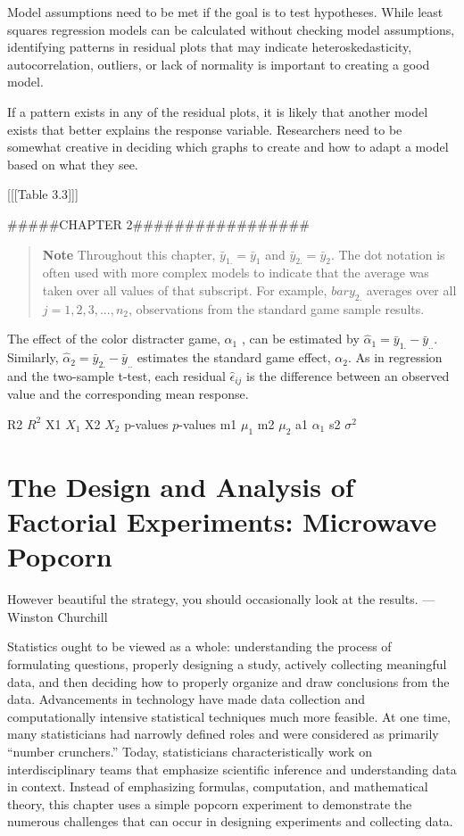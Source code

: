 \documentclass[
]{report}
\begin{document}
Model assumptions need to be met if the goal is to test hypotheses. While least squares regression models can be calculated without checking model assumptions, identifying patterns in residual plots that may indicate heteroskedasticity, autocorrelation, outliers, or lack of normality is important to creating a good model.

If a pattern exists in any of the residual plots, it is likely that another model exists that better explains the response variable. Researchers need to be somewhat creative in deciding which graphs to create and how to adapt a model based on what they see.

{[}{[}{[}Table 3.3{]}{]}{]}

\#\#\#\#\#CHAPTER 2\#\#\#\#\#\#\#\#\#\#\#\#\#\#\#\#\#

\begin{quote}
\textbf{Note}
Throughout this chapter, \(\bar{y}_{1.} = \bar{y}_{1}\) and \(\bar{y}_{2.} = \bar{y}_{2}\). The dot notation is often used with more complex models
to indicate that the average was taken over all values of that subscript. For example, \(bar{y}_{2.}\) averages over all
\(j = 1, 2, 3, ... , n_2\), observations from the standard game sample results.
\end{quote}

The effect of the color distracter game, \(\alpha_1\) , can be estimated by \(\hat{\alpha}_1 = \bar{y}_{1.} - \bar{y}_{..}\). Similarly, \(\hat{\alpha}_2 = \bar{y}_{2.} - \bar{y}_{..}\)
estimates the standard game effect, \(\alpha_2\). As in regression and the two-sample t-test, each residual \(\hat{\epsilon}_{ij}\) is the
difference between an observed value and the corresponding mean response.

R2 \(R^2\)
X1 \(X_1\)
X2 \(X_2\)
p-values \(p\)-values
m1 \(\mu_1\)
m2 \(\mu_2\)
a1 \(\alpha_1\)
s2 \(\sigma^2\)

\chapter{The Design and Analysis of Factorial Experiments: Microwave Popcorn}\label{the-design-and-analysis-of-factorial-experiments-microwave-popcorn}

However beautiful the strategy, you should occasionally
look at the results.
--- Winston Churchill

Statistics ought to be viewed as a whole: understanding the process of formulating questions, properly designing a study, actively collecting meaningful data, and then deciding
how to properly organize and draw conclusions from the data. Advancements in technology have made data collection and computationally intensive statistical techniques much more
feasible. At one time, many statisticians had narrowly defined roles and were considered as
primarily ``number crunchers.'' Today, statisticians characteristically work on interdisciplinary
teams that emphasize scientific inference and understanding data in context.
Instead of emphasizing formulas, computation, and mathematical theory, this chapter
uses a simple popcorn experiment to demonstrate the numerous challenges that can occur in
designing experiments and collecting data.
\end{document}
